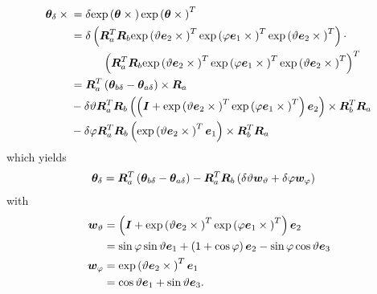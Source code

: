 \documentclass[10pt,fleqn,subeqn]{report}
\newcommand{\T}[1]{\bm{#1}}
\begin{document}
\begin{align}
	\T{\theta}_{\delta}\times{}
	&= \delta \llk{exp}\plbr{\T{\theta}\times{}}
		\llk{exp}\plbr{\T{\theta}\times{}}^T \nonumber \\
	&= \delta \plbr{
		\T{R}_a^T
		\T{R}_b
		\llk{exp}\plbr{\vartheta \T{e}_2\times{}}^T
		\llk{exp}\plbr{\varphi \T{e}_1\times{}}^T
		\llk{exp}\plbr{\vartheta \T{e}_2\times{}}^T
	} \cdot \nonumber \\
	&\mbox{\hspace{10mm}} \plbr{
		\T{R}_a^T
		\T{R}_b
		\llk{exp}\plbr{\vartheta \T{e}_2\times{}}^T
		\llk{exp}\plbr{\varphi \T{e}_1\times{}}^T
		\llk{exp}\plbr{\vartheta \T{e}_2\times{}}^T
	}^T \nonumber \\
	&= \T{R}_a^T
	\plbr{\T{\theta}_{b\delta} - \T{\theta}_{a\delta}}\times{} \T{R}_a
	\nonumber \\
	& \mbox{} -
	\delta\vartheta \T{R}_a^T \T{R}_b \plbr{
		\plbr{
			\T{I}
			+ \llk{exp}\plbr{\vartheta \T{e}_2\times{}}^T
			\llk{exp}\plbr{\varphi \T{e}_1\times{}}^T
		} \T{e}_2
	}\times \T{R}_b^T \T{R}_a
	\nonumber \\
	& \mbox{} -
	\delta\varphi \T{R}_a^T \T{R}_b \plbr{
		\llk{exp}\plbr{\vartheta \T{e}_2\times{}}^T \T{e}_1
	} \times \T{R}_b^T \T{R}_a
\end{align}
which yields
\begin{align}
	\T{\theta}_{\delta}
	&= \T{R}_a^T \plbr{\T{\theta}_{b\delta} - \T{\theta}_{a\delta}}
	- \T{R}_a^T \T{R}_b \plbr{
		\delta\vartheta \T{w}_{\vartheta}
		+ \delta\varphi \T{w}_{\varphi}
	}
\end{align}
with
\begin{subequations}
\begin{align}
	\T{w}_{\vartheta}
	&= \plbr{
		\T{I}
		+ \llk{exp}\plbr{\vartheta \T{e}_2\times{}}^T
		\llk{exp}\plbr{\varphi \T{e}_1\times{}}^T
	} \T{e}_2
	\nonumber \\
	&= \sin\varphi \sin\vartheta \T{e}_1
	+ \plbr{1 + \cos\varphi} \T{e}_2
	- \sin\varphi \cos\vartheta \T{e}_3 \\
	\T{w}_{\varphi}
	&= \llk{exp}\plbr{\vartheta \T{e}_2\times{}}^T \T{e}_1
	\nonumber \\
	&= \cos\vartheta \T{e}_1 + \sin\vartheta \T{e}_3 .
\end{align}
\end{subequations}
\end{document}
